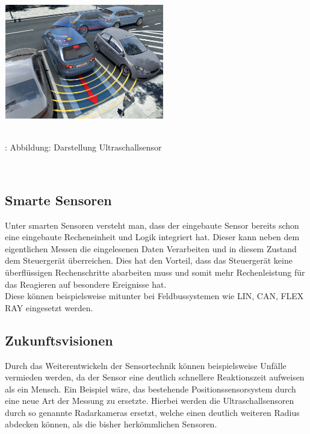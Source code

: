 					\begin{center}
						\includegraphics[width=7cm, height=5cm] {ultraschall.png}
						\caption {\\\cite{TS33}: Abbildung: Darstellung Ultraschallsensor}
					\end{center}\\
					
				
				
		\subsection{Smarte Sensoren} 
			Unter smarten Sensoren versteht man, dass der eingebaute Sensor bereits schon eine eingebaute Recheneinheit und Logik integriert hat. Dieser kann neben dem eigentlichen Messen die eingelesenen Daten Verarbeiten und in diesem Zustand dem Steuergerät überreichen. Dies hat den Vorteil, dass das Steuergerät keine überflüssigen Rechenschritte abarbeiten muss und somit mehr Rechenleistung für das Reagieren auf besondere Ereignisse hat.\\
			Diese können beispielsweise mitunter bei Feldbussystemen wie LIN, CAN, FLEX RAY eingesetzt werden.		
		
		
		
		\subsection{Zukunftsvisionen} 
 			Durch das Weiterentwickeln der Sensortechnik können beispielsweise Unfälle vermieden werden, da der Sensor eine deutlich schnellere Reaktionszeit aufweisen als ein Mensch. Ein Beispiel wäre, das bestehende Positionssensorsystem durch eine neue Art der Messung zu ersetzte. Hierbei werden die Ultraschallsensoren durch so genannte Radarkameras ersetzt, welche einen deutlich weiteren Radius abdecken können, als die bisher herkömmlichen Sensoren.\\
 			
